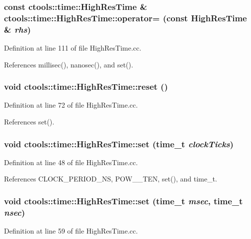 \subsubsection{\setlength{\rightskip}{0pt plus 5cm}const {\bf ctools::time::High\-Res\-Time} \& ctools::time::High\-Res\-Time::operator= (const {\bf High\-Res\-Time} \& {\em rhs})}\label{classctools_1_1time_1_1HighResTime_a16}




Definition at line 111 of file High\-Res\-Time.cc.

References millisec(), nanosec(), and set().
\subsubsection{\setlength{\rightskip}{0pt plus 5cm}void ctools::time::High\-Res\-Time::reset ()}\label{classctools_1_1time_1_1HighResTime_a10}




Definition at line 72 of file High\-Res\-Time.cc.

References set().
\subsubsection{\setlength{\rightskip}{0pt plus 5cm}void ctools::time::High\-Res\-Time::set ({\bf time\_\-t} {\em clock\-Ticks})}\label{classctools_1_1time_1_1HighResTime_a9}




Definition at line 48 of file High\-Res\-Time.cc.

References CLOCK\_\-PERIOD\_\-NS, POW\_\_\-TEN, set(), and time\_\-t.
\subsubsection{\setlength{\rightskip}{0pt plus 5cm}void ctools::time::High\-Res\-Time::set ({\bf time\_\-t} {\em msec}, {\bf time\_\-t} {\em nsec})}\label{classctools_1_1time_1_1HighResTime_a8}




Definition at line 59 of file High\-Res\-Time.cc.

